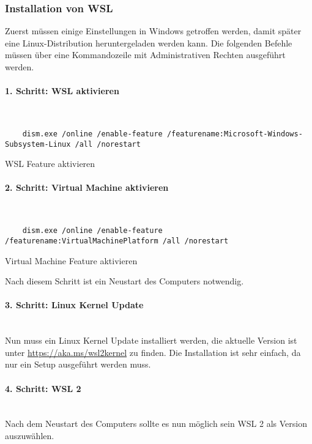 \subsubsection{Installation von WSL}
Zuerst müssen einige Einstellungen in Windows getroffen werden, damit später eine
Linux-Distribution heruntergeladen werden kann. Die folgenden Befehle müssen über eine
Kommandozeile mit Administrativen Rechten ausgeführt werden.
\\
\paragraph{1. Schritt: WSL aktivieren}\mbox{}\\
\begin{listing}[H]
  \begin{verbatim}
    dism.exe /online /enable-feature /featurename:Microsoft-Windows-Subsystem-Linux /all /norestart
  \end{verbatim}
  \caption{WSL Feature aktivieren}
\end{listing}

\paragraph{2. Schritt: Virtual Machine aktivieren}\mbox{}\\
\begin{listing}[H]
  \begin{verbatim}
    dism.exe /online /enable-feature /featurename:VirtualMachinePlatform /all /norestart
  \end{verbatim}
  \caption{Virtual Machine Feature aktivieren}
\end{listing}

Nach diesem Schritt ist ein Neustart des Computers notwendig.

\paragraph{3. Schritt: Linux Kernel Update}\mbox{}\\
Nun muss ein Linux Kernel Update installiert werden, die aktuelle Version ist
unter \url{https://aka.ms/wsl2kernel} zu finden. Die Installation ist sehr
einfach, da nur ein Setup ausgeführt werden muss.

\paragraph{4. Schritt: WSL 2}\mbox{}\\
Nach dem Neustart des Computers sollte es nun möglich sein WSL 2 als Version
auszuwählen.

